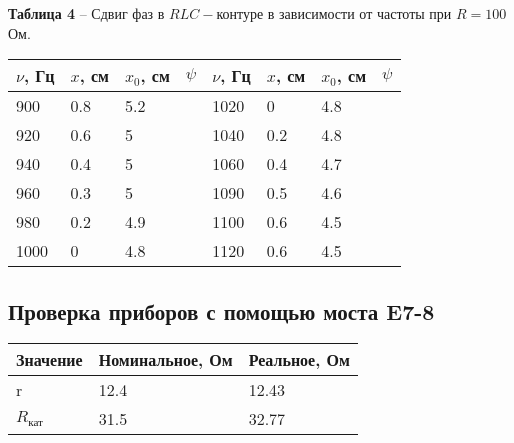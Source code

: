 \documentclass[12pt,a4paper]{article}
\begin{document}
\begin{itemize}
            \begin{table}[!h]
            \begin{flushleft}
           		\hspace{20}\textbf{Таблица 4} --  Сдвиг фаз в $RLC-$контуре в зависимости от частоты при $R = 100$ Ом.\\
            \end{flushleft}
                \begin{center}
                    \begin{tabular}{ | l | l | l | l | l | l | l | l |}
                        \hline
                        $\nu$, Гц   &   $x$, см &  $x_0$, см&   $\psi$  &   $\nu$, Гц   &   $x$, см &  $x_0$, см    &   $\psi$  \\
                        \hline
                        900         &   0.8     &   5.2     &           &   1020        &   0       &   4.8         &      \\
                        920         &   0.6     &   5       &           &   1040        &   0.2     &   4.8         &      \\
                        940         &   0.4     &   5       &           &   1060        &   0.4     &   4.7         &      \\
                        960         &   0.3     &   5       &           &   1090        &   0.5     &   4.6         &      \\
                        980         &   0.2     &   4.9     &           &   1100        &   0.6     &   4.5         &    \\
                        1000        &   0       &   4.8     &           &   1120        &   0.6     &   4.5         &    \\
                        \hline         
                    \end{tabular}
                \end{center}
            \end{table}
        \end{itemize}
        
    \subsection{Проверка приборов с помощью моста E7-8}
        \begin{center}
            \begin{tabular}{ | l | l | l |}
                \hline
                Значение        &   Номинальное, Ом &   Реальное, Ом \\
                \hline
                r               &   12.4            &   12.43    \\
                $R_\text{кат}$  &   31.5            &   32.77    \\
                \hline                
            \end{tabular}
        \end{center}
        
\end{document}
